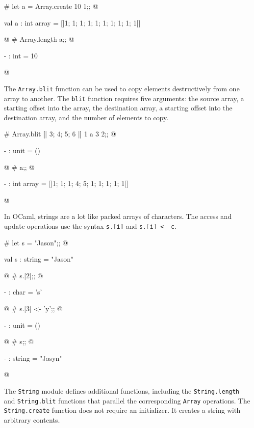 \begin{ocaml}
# let a = Array.create 10 1;;
@
\begin{topoutput}
val a : int array = [|1; 1; 1; 1; 1; 1; 1; 1; 1; 1|]
\end{topoutput}
@
# Array.length a;;
@
\begin{topoutput}
- : int = 10
\end{topoutput}
@
\end{ocaml}
%
The \hbox{\lstinline/Array.blit/} function can be used to copy elements
destructively from one array to another.  The \hbox{\lstinline/blit/} function
requires five arguments: the source array, a starting offset into the
array, the destination array, a starting offset into the destination
array, and the number of elements to copy.

\begin{ocaml}
# Array.blit [| 3; 4; 5; 6 |] 1 a 3 2;;
@
\begin{topoutput}
- : unit = ()
\end{topoutput}
@
# a;;
@
\begin{topoutput}
- : int array = [|1; 1; 1; 4; 5; 1; 1; 1; 1; 1|]
\end{topoutput}
@
\end{ocaml}


\label{keyword:string-subscript}
\label{keyword:<-(string-assignment)}
\index{.[@\lstinline/.[]/ string subscripting}
In OCaml, strings are a lot like packed arrays of characters.  The
access and update operations use the syntax \hbox{\lstinline/s.[i]/} and
\hbox{\lstinline/s.[i] <- c/}.

\begin{ocaml}
# let s = "Jason";;
@
\begin{topoutput}
val s : string = "Jason"
\end{topoutput}
@
# s.[2];;
@
\begin{topoutput}
- : char = 's'
\end{topoutput}
@
# s.[3] <- 'y';;
@
\begin{topoutput}
- : unit = ()
\end{topoutput}
@
# s;;
@
\begin{topoutput}
- : string = "Jasyn"
\end{topoutput}
@
\end{ocaml}
%
The \hbox{\lstinline/String/} module defines additional functions, including the
\hbox{\lstinline/String.length/} and \hbox{\lstinline/String.blit/} functions that parallel
the corresponding \hbox{\lstinline/Array/} operations.  The \hbox{\lstinline/String.create/}
function does not require an initializer.  It creates a string with
arbitrary contents.

